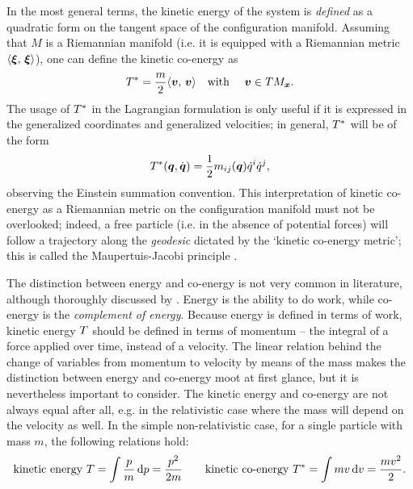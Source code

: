 In the most general terms, the kinetic energy of the system is \emph{defined} as a quadratic form on the tangent space of the configuration manifold. Assuming that $M$ is a Riemannian manifold (i.e. it is equipped with a Riemannian metric $\langle \vb*{\xi},\, \vb*{\xi}\rangle$), one can define the kinetic co-energy as
\begin{equation}
    \ecokin = \frac{m}{2}\inner{\vec{v}}{\vec{v}}\qq{with } \vec{v} \in TM_{\vec{x}}.
    \label{eq:ekin_mfld}
\end{equation}
The usage of $T^*$ in the Lagrangian formulation is only useful if it is expressed in the generalized coordinates and generalized velocities; in general, $T^*$ will be of the form
\begin{equation}
    T^*(\vb*{q}, \dot{\vb*{q}}) = \frac{1}{2}m_{ij}(\vb*{q})\dot{q}^i\dot{q}^j,
    \label{eq:kinetic_energy}
\end{equation}
observing the Einstein summation convention. This interpretation of kinetic co-energy as a Riemannian metric on the configuration manifold must not be overlooked; indeed, a free particle (i.e. in the absence of potential forces) will follow a trajectory along the \emph{geodesic} dictated by the `kinetic co-energy metric'; this is called the Maupertuis-Jacobi principle \cite{Arnold1989}.

The distinction between energy and co-energy is not very common in literature, although thoroughly discussed by \citet{Jeltsema2009}. Energy is the ability to do work, while co-energy is the \emph{complement of energy}. Because energy is defined in terms of work, kinetic energy $T$ should be defined in terms of momentum -- the integral of a force applied over time, instead of a velocity. The linear relation behind the change of variables from momentum to velocity by means of the mass makes the distinction between energy and co-energy moot at first glance, but it is nevertheless important to consider. The kinetic energy and co-energy are not always equal after all, e.g. in the relativistic case where the mass will depend on the velocity as well. In the simple non-relativistic case, for a single particle with mass $m$, the following relations hold:
$$ \text{kinetic energy } T = \int \frac{p}{m}\dd{p} = \frac{p^2}{2m}\qquad
   \text{kinetic co-energy } T^* = \int m v \dd{v} = \frac{mv^2}{2}.$$

